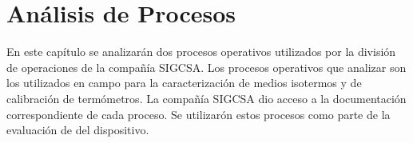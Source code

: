\chapter{Análisis de Procesos}

\par 
En este capítulo se analizarán dos procesos operativos utilizados por la división de operaciones de la compañía SIGCSA. Los procesos operativos que analizar son los utilizados en campo para la caracterización de medios isotermos y de calibración de termómetros. La compañía SIGCSA dio acceso a la documentación correspondiente de cada proceso. Se utilizarón estos procesos como parte de la evaluación de del dispositivo.




	
